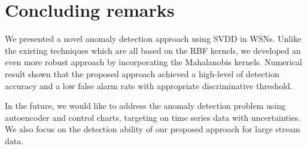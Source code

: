 \documentclass[conference]{IEEEtran}
\theoremstyle{problemstyle}
\begin{document}
\section{Concluding remarks}\label{sec:concluding}

We presented a novel anomaly detection approach using SVDD in WSNs. Unlike the existing techniques which are all based on the RBF kernels, we developed an even more robust approach by incorporating the Mahalanobis kernels. Numerical result shown that the proposed approach achieved a high-level of detection accuracy and a low false alarm rate with appropriate  discriminative threshold.  

In the future, we would like to address the anomaly detection problem using autoencoder and control charts, targeting on time series data with uncertainties. We also focus on the detection ability of our proposed approach for large stream data.



\end{document}
